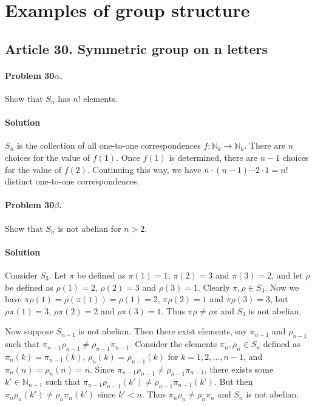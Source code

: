 \section{Examples of group structure}


\subsection{Article 30. Symmetric group on n letters}

\paragraph{Problem 30$\alpha$.}
Show that $S_n$ has $n!$ elements.

\paragraph*{Solution}
$S_n$ is the collection of all one-to-one correspondences
$f:\mathbb{N}_k \rightarrow \mathbb{N}_k$. There are $n$ choices for the value
of $f(1)$. Once $f(1)$ is determined, there are $n-1$ choices for the value of
$f(2)$. Continuing this way, we have $n \cdot (n-1) \cdots 2 \cdot 1 = n!$ distinct
one-to-one correspondences.

\paragraph{Problem 30$\beta$.}
Show that $S_n$ is not abelian for $n > 2$.

\paragraph*{Solution}
Consider $S_3$. Let $\pi$ be defined as $\pi(1) = 1$, $\pi(2) = 3$ and $\pi(3) = 2$,
and let $\rho$ be defined as $\rho(1) = 2$, $\rho(2) = 3$ and $\rho(3) = 1$. Clearly
$\pi, \rho \in S_3$. Now we have $\pi \rho (1) = \rho (\pi (1)) = \rho (1) = 2$,
$\pi \rho (2) = 1$ and $\pi \rho (3) = 3$, but $\rho \pi (1) = 3$, $\rho \pi (2) = 2$
and $\rho \pi (3) = 1$. Thus $\pi \rho \neq \rho \pi$ and $S_3$ is not abelian.

Now suppose $S_{n-1}$ is not abelian. Then there exist elements, say $\pi_{n-1}$
and $\rho_{n-1}$ such that $\pi_{n-1} \rho_{n-1} \neq \rho_{n-1} \pi_{n-1}$.
Consider the elements $\pi_n, \rho_n \in S_n$ defined as $\pi_n(k) = \pi_{n-1}(k)$,
$\rho_n(k) = \rho_{n-1}(k)$ for $k = 1, 2, \dots, n-1$, and $\pi_n(n) = \rho_n(n) = n$.
Since $\pi_{n-1} \rho_{n-1} \neq \rho_{n-1} \pi_{n-1}$, there exists some
$k' \in \mathbb{N}_{n-1}$ such that $\pi_{n-1} \rho_{n-1} (k') \neq \rho_{n-1} \pi_{n-1} (k')$.
But then $\pi_n \rho_n (k') \neq \rho_n \pi_n (k')$ since $k' < n$. Thus
$\pi_n \rho_n \neq \rho_n \pi_n$ and $S_n$ is not abelian.


